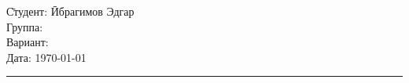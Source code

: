 \begin{tabbing}
	\hspace{11cm} \= Студент: \= Ибрагимов Эдгар \\ %
	\> Группа:  \\  %
	\> Вариант:  \\    %
	\> Дата: \> \today     %
\end{tabbing}
\hrule
\vspace{1cm}